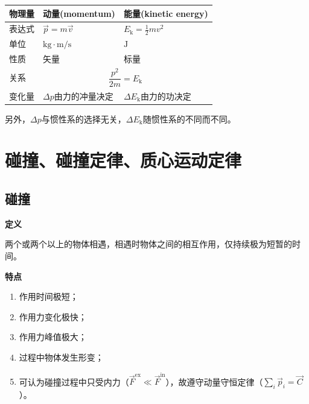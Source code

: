 \documentclass[12pt, a4paper]{article}
\numberwithin{equation}{section}
\begin{document}
    \begin{table}[htbp]
        \centering
        \begin{tabular}{|l|ll|}
            \hline
            \textbf{物理量} & \multicolumn{1}{l|}{\textbf{动量(momentum)}}                    & \textbf{能量(kinetic energy)}      \\ \hline
            表达式          & \multicolumn{1}{l|}{\(\overrightarrow{p} = m\overrightarrow{v}\)} & \(E_{\mathrm{k}} = \frac{1}{2}mv^2\) \\ \hline
            单位  & \multicolumn{1}{l|}{\(\mathrm{kg \cdot m / s}\)} & \(\mathrm{J}\)                  \\ \hline
            性质  & \multicolumn{1}{l|}{矢量}                      & 标量                          \\ \hline
            关系  & \multicolumn{2}{c|}{\(\dfrac{p^2}{2m} = E_{\mathrm{k}}\)}                       \\ \hline
            变化量 & \multicolumn{1}{l|}{\(\Delta p\)由力的冲量决定}         & \(\Delta E_{\mathrm{k}}\)由力的功决定 \\ \hline
        \end{tabular}
    \end{table}

    另外，\(\Delta p\)与惯性系的选择无关，\(\Delta E_{\mathrm{k}}\)随惯性系的不同而不同。

\section{碰撞、碰撞定律、质心运动定律}

\subsection{碰撞}

    \textbf{定义}

    两个或两个以上的物体相遇，相遇时物体之间的相互作用，仅持续极为短暂的时间。

    \textbf{特点}

    \begin{enumerate}
        \item 作用时间极短；
        \item 作用力变化极快；
        \item 作用力峰值极大；
        \item 过程中物体发生形变；
        \item 可认为碰撞过程中只受内力（\(\overrightarrow{F}^{\mathrm{ex}} \ll \overrightarrow{F}^{\mathrm{in}}\)），故遵守动量守恒定律（\(\sum_{i} \overrightarrow{p}_{i} = \overrightarrow{C}\)）。
    \end{enumerate}
\end{document}
